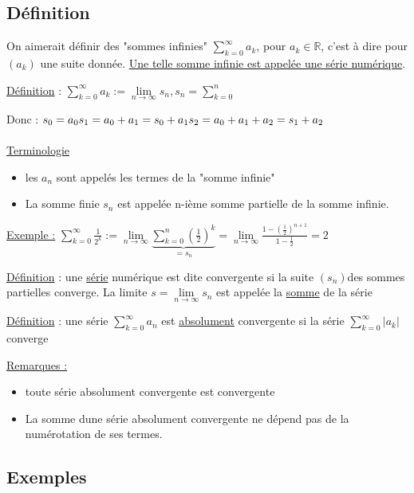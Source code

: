 \documentclass[12pt,a4paper]{article}
\newcommand{\limite}{\lim\limits_}
\newcommand{\ninf}{\ensuremath{n \to \infty}}
\newcommand{\R}{\ensuremath{\mathbb{R}} }
\newcommand{\Definition}{\underline{Définition} }
\newcommand{\skinf}{\sum^{\infty}_{k=0}}
\begin{document}
{\subsection{Définition}
On aimerait définir des "sommes infinies" $\skinf a_k$, pour $a_k \in \R$, c'est à dire pour $(a_k)$ une suite donnée. \underline{Une telle somme infinie est appelée une série numérique}.
\begin{boite}
\Definition : $\skinf a_k := \limite{\ninf} s_n, s_n = \sum^n_{k=0}$
\end{boite}
Donc : $s_0 =a_0\\
s_1 = a_0 + a_1 = s_0 + a_1\\
s_2 = a_0 + a_1 + a_2 = s_1 + a_2$\\
\\
\underline{Terminologie} 
\begin{itemize}
\item les $a_n$ sont appelés les termes de la "somme infinie"
\item La somme finie $s_n$ est appelée n-ième somme partielle de la somme infinie.
\end{itemize}
\underline{Exemple :} $\skinf \frac{1}{2^k} := \limite{\ninf}\underbrace{\sum^n_{k=0} (\frac{1}{2})^k}_{=s_n} = \limite{\ninf}\frac{1-(\frac{1}{2})^{n+1}}{1-\frac{1}{2}} = 2$
\begin{boite}
\Definition : une \underline{série} numérique est dite convergente si la suite $(s_n)$des sommes partielles converge. La limite $s= \limite{\ninf} s_n$ est appelée la \underline{somme} de la série
\end{boite}
\begin{boite}
\Definition : une série $\skinf a_n$ est \underline{absolument} convergente si la série
$\skinf |a_k|$ converge
\end{boite}
\underline{Remarques :}
\begin{itemize}
\item toute série absolument convergente est convergente
\item La somme dune série absolument convergente ne dépend pas de la numérotation de ses termes.
\end{itemize}
\subsection{Exemples}
}
\end{document}

